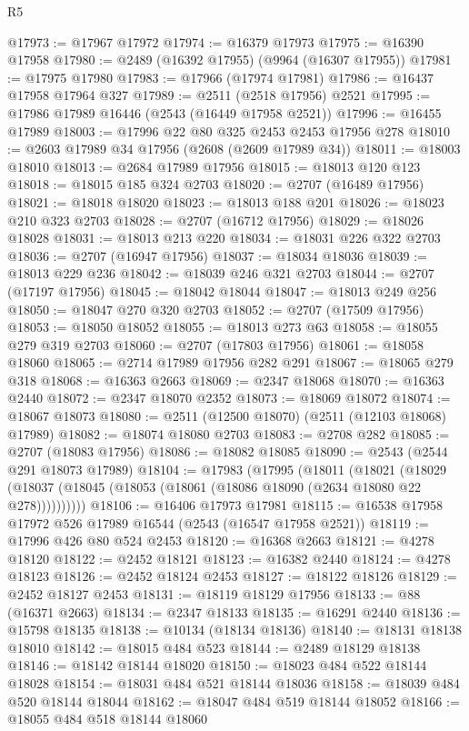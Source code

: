 \begin{lexlean}{R5}
\begin{coremodule}
@17973 := @17967 @17972
@17974 := @16379 @17973
@17975 := @16390 @17958
@17980 := @2489 (@16392 @17955) (@9964 (@16307 @17955))
@17981 := @17975 @17980
@17983 := @17966 (@17974 @17981)
@17986 := @16437 @17958 @17964 @327
@17989 := @2511 (@2518 @17956) @2521
@17995 := @17986 @17989 @16446 (@2543 (@16449 @17958 @2521))
@17996 := @16455 @17989
@18003 := @17996 @22 @80 @325 @2453 @2453 @17956 @278
@18010 := @2603 @17989 @34 @17956 (@2608 (@2609 @17989 @34))
@18011 := @18003 @18010
@18013 := @2684 @17989 @17956
@18015 := @18013 @120 @123
@18018 := @18015 @185 @324 @2703
@18020 := @2707 (@16489 @17956)
@18021 := @18018 @18020
@18023 := @18013 @188 @201
@18026 := @18023 @210 @323 @2703
@18028 := @2707 (@16712 @17956)
@18029 := @18026 @18028
@18031 := @18013 @213 @220
@18034 := @18031 @226 @322 @2703
@18036 := @2707 (@16947 @17956)
@18037 := @18034 @18036
@18039 := @18013 @229 @236
@18042 := @18039 @246 @321 @2703
@18044 := @2707 (@17197 @17956)
@18045 := @18042 @18044
@18047 := @18013 @249 @256
@18050 := @18047 @270 @320 @2703
@18052 := @2707 (@17509 @17956)
@18053 := @18050 @18052
@18055 := @18013 @273 @63
@18058 := @18055 @279 @319 @2703
@18060 := @2707 (@17803 @17956)
@18061 := @18058 @18060
@18065 := @2714 @17989 @17956 @282 @291
@18067 := @18065 @279 @318
@18068 := @16363 @2663
@18069 := @2347 @18068
@18070 := @16363 @2440
@18072 := @2347 @18070 @2352
@18073 := @18069 @18072
@18074 := @18067 @18073
@18080 := @2511 (@12500 @18070) (@2511 (@12103 @18068) @17989)
@18082 := @18074 @18080 @2703
@18083 := @2708 @282
@18085 := @2707 (@18083 @17956)
@18086 := @18082 @18085
@18090 := @2543 (@2544 @291 @18073 @17989)
@18104 := @17983
    (@17995
      (@18011
        (@18021
          (@18029 (@18037 (@18045 (@18053 (@18061 (@18086 @18090 (@2634 @18080 @22 @278))))))))))
@18106 := @16406 @17973 @17981
@18115 := @16538 @17958 @17972 @526 @17989 @16544 (@2543 (@16547 @17958 @2521))
@18119 := @17996 @426 @80 @524 @2453
@18120 := @16368 @2663
@18121 := @4278 @18120
@18122 := @2452 @18121
@18123 := @16382 @2440
@18124 := @4278 @18123
@18126 := @2452 @18124 @2453
@18127 := @18122 @18126
@18129 := @2452 @18127 @2453
@18131 := @18119 @18129 @17956
@18133 := @88 (@16371 @2663)
@18134 := @2347 @18133
@18135 := @16291 @2440
@18136 := @15798 @18135
@18138 := @10134 (@18134 @18136)
@18140 := @18131 @18138 @18010
@18142 := @18015 @484 @523
@18144 := @2489 @18129 @18138
@18146 := @18142 @18144 @18020
@18150 := @18023 @484 @522 @18144 @18028
@18154 := @18031 @484 @521 @18144 @18036
@18158 := @18039 @484 @520 @18144 @18044
@18162 := @18047 @484 @519 @18144 @18052
@18166 := @18055 @484 @518 @18144 @18060

\end{coremodule}
\end{lexlean}
